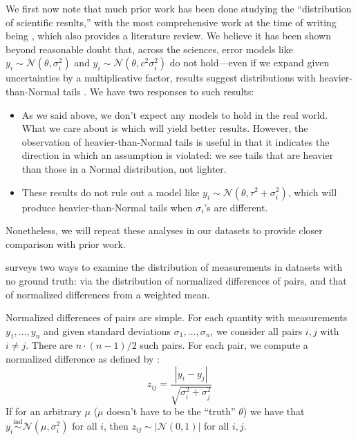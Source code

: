 \documentclass[letterpaper,12pt]{article}
\begin{document}
We first now note that much prior work has been done studying the ``distribution of scientific results,'' with the most comprehensive work at the time of writing being \citet{bailey2017not}, which also provides a literature review. We believe it has been shown beyond reasonable doubt that, across the sciences, error models like $y_i\sim\mathcal{N}(\theta,\sigma_i^2)$ and $y_i\sim\mathcal{N}(\theta,c^2\sigma_i^2)$ do not hold---even if we expand given uncertainties by a multiplicative factor, results suggest distributions with heavier-than-Normal tails \citep{bailey2017not,chen2003non}. We have two responses to such results:
\begin{itemize}
  \item As we said above, we don't expect any models to hold in the real world. What we care about is which will yield better results. However, the observation of heavier-than-Normal tails is useful in that it indicates the direction in which an assumption is violated: we see tails that are heavier than those in a Normal distribution, not lighter.
  \item These results do not rule out a model like $y_i\sim\mathcal{N}(\theta,\tau^2+\sigma_i^2)$, which will produce heavier-than-Normal tails when $\sigma_i$'s are different.
\end{itemize}
Nonetheless, we will repeat these analyses in our datasets to provide closer comparison with prior work.

\citet{bailey2017not} surveys two ways to examine the distribution of measurements in datasets with no ground truth: via the distribution of normalized differences of pairs, and that of normalized differences from a weighted mean.

Normalized differences of pairs are simple. For each quantity with measurements $y_1,\ldots,y_n$ and given standard deviations $\sigma_1,\ldots,\sigma_n$, we consider all pairs $i,j$ with $i\neq j$. There are $n\cdot(n-1)/2$ such pairs. For each pair, we compute a normalized difference as defined by \citet[eq.~2.1]{bailey2017not}:
\begin{equation}\label{eq:zij}
  z_{ij}=\frac{|y_i-y_j|}{\sqrt{\sigma_i^2+\sigma_j^2}}
\end{equation}
If for an arbitrary $\mu$ ($\mu$ doesn't have to be the ``truth'' $\theta$) we have that $y_i\overset{\mathrm{ind}}{\sim}\mathcal{N}(\mu,\sigma_i^2)$ for all $i$, then $z_{ij}\sim|\mathcal{N}(0,1)|$ for all $i,j$.
\end{document}
